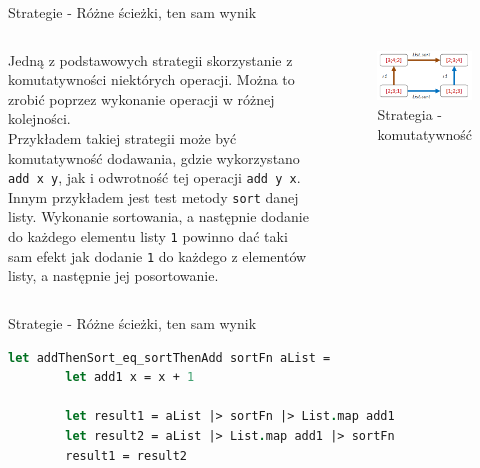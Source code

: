 \begin{frame}{Strategie - Różne ścieżki, ten sam wynik}
    \begin{columns}[t]
            Jedną z podstawowych strategii skorzystanie z komutatywności niektórych operacji. Można to zrobić poprzez wykonanie operacji w różnej kolejności.\\
            Przykładem takiej strategii może być komutatywność dodawania, gdzie wykorzystano \texttt{add x y}, jak i odwrotność tej operacji \texttt{add y x}.\\ 
            Innym przykładem jest test metody \texttt{sort} danej listy. 
            Wykonanie sortowania, a następnie dodanie do każdego elementu listy \texttt{1} powinno dać taki sam efekt jak dodanie \texttt{1} do każdego z elementów listy, a następnie jej posortowanie.
        \centering
        \begin{figure}
            \centering
            \includegraphics[width=1\textwidth]{images/property_list_sort1.png}
            \caption{Strategia - komutatywność}
            \label{fig:commutative_strategy_example}
        \end{figure}    
    \end{columns}
\end{frame}

\begin{frame}[fragile]{Strategie - Różne ścieżki, ten sam wynik}
    \begin{lstlisting}[language=FSharp, xleftmargin=-10pt,xrightmargin=-10pt,numbers=none, basicstyle=\ttfamily\small]
    let addThenSort_eq_sortThenAdd sortFn aList =
        let add1 x = x + 1
        
        let result1 = aList |> sortFn |> List.map add1
        let result2 = aList |> List.map add1 |> sortFn
        result1 = result2
    \end{lstlisting}
\end{frame}

